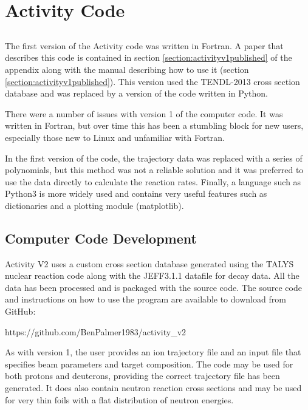 \FloatBarrier
\section{Activity Code}

\subsection{}

The first version of the Activity code was written in Fortran.  A paper that describes this code is contained in section \ref{section:activityv1published} of the appendix along with the manual describing how to use it (section \ref{section:activityv1published}).  This version used the TENDL-2013 cross section database and was replaced by a version of the code written in Python.

There were a number of issues with version 1 of the computer code.  It was written in Fortran, but over time this has been a stumbling block for new users, especially those new to Linux and unfamiliar with Fortran. 

In the first version of the code, the trajectory data was replaced with a series of polynomials, but this method was not a reliable solution and it was preferred to use the data directly to calculate the reaction rates.  Finally, a language such as Python3 is more widely used and contains very useful features such as dictionaries and a plotting module (matplotlib).


\subsection{Computer Code Development}

Activity V2 uses a custom cross section database generated using the TALYS nuclear reaction code along with the JEFF3.1.1 datafile for decay data.  All the data has been processed and is packaged with the source code.  The source code and instructions on how to use the program are available to download from GitHub: 

https://github.com/BenPalmer1983/activity\_v2

As with version 1, the user provides an ion trajectory file and an input file that specifies beam parameters and target composition.  The code may be used for both protons and deuterons, providing the correct trajectory file has been generated.  It does also contain neutron reaction cross sections and may be used for very thin foils with a flat distribution of neutron energies.




